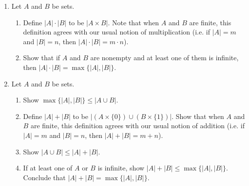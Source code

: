 \begin{enumerate}
	\item Let $A$ and $B$ be sets. 
\begin{enumerate}
    \item Define $|A| \cdot |B|$ to be $|A \times B|$. Note that when $A$ and $B$ are finite, this definition agrees with our usual notion of multiplication (i.e. if $|A| = m$ and $|B| = n$, then $|A| \cdot |B| = m \cdot n$).
    \item Show that if $A$ and $B$ are nonempty and at least one of them is infinite, then $|A| \cdot |B| = \max\{|A|, |B|\}$.
\end{enumerate}
	
	\item Let $A$ and $B$ be sets. 
\begin{enumerate}
    \item Show $\max\{|A|, |B|\} \leq |A \cup B|$.
    \item Define $|A| + |B|$ to be $|(A \times \{0\}) \cup (B \times \{1\})|$. Show that when $A$ and $B$ are finite, this definition agrees with our usual notion of addition (i.e. if $|A| = m$ and $|B| = n$, then $|A| + |B| = m + n$).
    \item Show $|A \cup B| \leq |A| + |B|$.
    \item If at least one of $A$ or $B$ is infinite, show $|A| + |B| \leq \max\{|A|,|B|\}$. Conclude that $|A| + |B| = \max\{|A|,|B|\}$.
\end{enumerate}
\end{enumerate}
